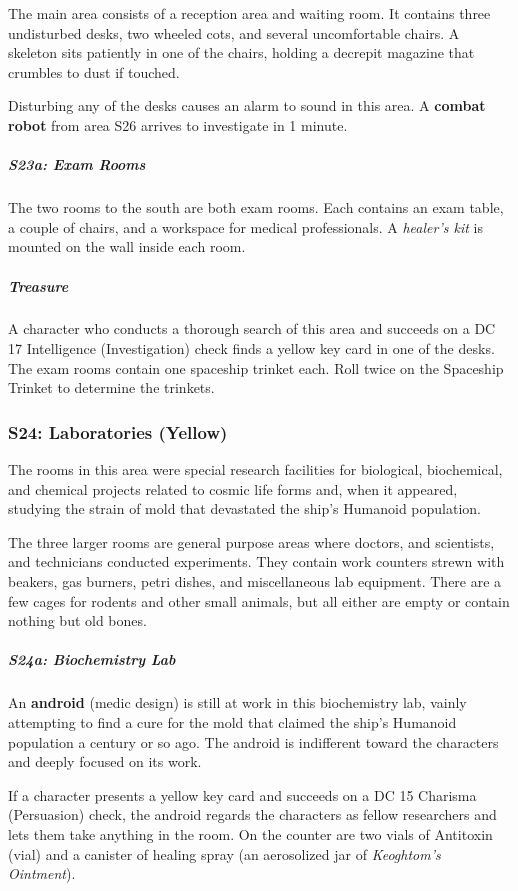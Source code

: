 \documentclass[10pt,a4paper,twoside,bg=print,twocolumn,openany,nodeprecatedcode]{dndbook}
\begin{document}
The main area consists of a reception area and waiting room. It contains three undisturbed desks, two wheeled cots, and several uncomfortable chairs. A skeleton sits patiently in one of the chairs, holding a decrepit magazine that crumbles to dust if touched.

Disturbing any of the desks causes an alarm to sound in this area. A \textbf{combat robot} from area S26 arrives to investigate in 1 minute.

\subparagraph{S23a: Exam Rooms}
The two rooms to the south are both exam rooms. Each contains an exam table, a couple of chairs, and a workspace for medical professionals. A \textit{healer's kit} is mounted on the wall inside each room.

\subparagraph{Treasure}
A character who conducts a thorough search of this area and succeeds on a DC 17 Intelligence (Investigation) check finds a yellow key card in one of the desks. The exam rooms contain one spaceship trinket each. Roll twice on the Spaceship Trinket to determine the trinkets.

\subsubsection{S24: Laboratories (Yellow)}
The rooms in this area were special research facilities for biological, biochemical, and chemical projects related to cosmic life forms and, when it appeared, studying the strain of mold that devastated the ship's Humanoid population.

The three larger rooms are general purpose areas where doctors, and scientists, and technicians conducted experiments. They contain work counters strewn with beakers, gas burners, petri dishes, and miscellaneous lab equipment. There are a few cages for rodents and other small animals, but all either are empty or contain nothing but old bones.

\subparagraph{S24a: Biochemistry Lab}
An \textbf{android} (medic design) is still at work in this biochemistry lab, vainly attempting to find a cure for the mold that claimed the ship's Humanoid population a century or so ago. The android is indifferent toward the characters and deeply focused on its work.

If a character presents a yellow key card and succeeds on a DC 15 Charisma (Persuasion) check, the android regards the characters as fellow researchers and lets them take anything in the room. On the counter are two vials of Antitoxin (vial) and a canister of healing spray (an aerosolized jar of \textit{Keoghtom's Ointment}).
\end{document}
